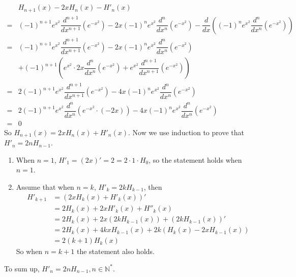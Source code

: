 \documentclass[a4paper,12pt,titlepage]{article}
\begin{document}
\subsection{}
\begin{align*}
&H_{n+1}(x)-2xH_n(x)-H'_n(x)\\
=&(-1)^{n+1} e^{x^2}\dfrac{d^{n+1}}{dx^{n+1}}(e^{-x^2})-2x(-1)^{n} e^{x^2}\dfrac{d^{n}}{dx^{n}}(e^{-x^2})-\dfrac{d}{dx}((-1)^{n} e^{x^2}\dfrac{d^{n}}{dx^{n}}(e^{-x^2}))\\
=&(-1)^{n+1} e^{x^2}\dfrac{d^{n+1}}{dx^{n+1}}(e^{-x^2})-2x(-1)^{n} e^{x^2}\dfrac{d^{n}}{dx^{n}}(e^{-x^2})\\
&+(-1)^{n+1}(e^{x^2}\cdot2x\dfrac{d^{n}}{dx^{n}}(e^{-x^2})+e^{x^2}\dfrac{d^{n+1}}{dx^{n+1}}(e^{-x^2}))\\
=&2(-1)^{n+1}e^{x^2}\dfrac{d^{n+1}}{dx^{n+1}}(e^{-x^2})-4x(-1)^{n} e^{x^2}\dfrac{d^{n}}{dx^{n}}(e^{-x^2})\\
=&2(-1)^{n+1}e^{x^2}\dfrac{d^{n}}{dx^{n}}(e^{-x^2}\cdot(-2x))-4x(-1)^{n} e^{x^2}\dfrac{d^{n}}{dx^{n}}(e^{-x^2})\\
=&0
\end{align*}
So $H_{n+1}(x)=2xH_n(x)+H'_n(x)$. Now we use induction to prove that $H'_n=2nH_{n-1}$.
\begin{enumerate}
\item When $n=1$, $H'_1=(2x)'=2=2\cdot1\cdot H_{0}$, so the statement holds when $n=1$.
\item Assume that when $n=k$, $H'_k=2kH_{k-1}$, then
\begin{align*}
H'_{k+1}&=(2xH_k(x)+H'_k(x))'\\
&=2H_k(x)+2xH'_k(x)+H''_k(x)\\
&=2H_k(x)+2x(2kH_{k-1}(x))+(2kH_{k-1}(x))'\\
&=2H_k(x)+4kxH_{k-1}(x)+2k(H_k(x)-2xH_{k-1}(x))\\
&=2(k+1)H_k(x)
\end{align*}
So when $n=k+1$ the statement also holds.
\end{enumerate}
To sum up, $H'_n=2nH_{n-1},n\in\mathbb{N}^*$.
\end{document}
